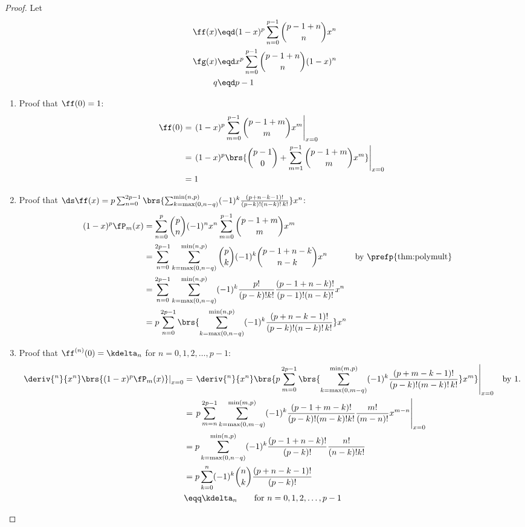 \begin{proof}
Let
\begin{align*}
  \ff(x) &\eqd (1-x)^p \sum_{n=0}^{p-1} {p-1+n \choose n} x^n      \\
  \fg(x) &\eqd x^p     \sum_{n=0}^{p-1} {p-1+n \choose n} (1-x)^n  \\
  q      &\eqd p-1
\end{align*}
  \begin{enumerate}
  \item Proof that $\ff(0)=1$:
  \begin{align*}
  \ff(0)
    &= \left.(1-x)^p \sum_{m=0}^{p-1} {p-1+m\choose m} x^m \right|_{x=0}
  \\&= \left.(1-x)^p \brs{{p-1 \choose 0} + \sum_{m=1}^{p-1} {p-1+m\choose m} x^m}\right|_{x=0}
  \\&= 1
  \end{align*}

  \item Proof that
      $\ds\ff(x)=
       p \sum_{n=0}^{2p-1}
       \brs{\sum_{k=\max(0,n-q)}^{\min(n,p)} (-1)^k \frac{(p+n-k-1)!}{(p-k)!(n-k)!\,k!}}
       x^n$:
  \begin{align*}
  (1-x)^p \fP_m(x)
    &= \sum_{n=0}^p     {p\choose n} (-1)^n x^n
       \sum_{m=0}^{p-1} {p-1+m\choose m} x^m
  \\&= \sum_{n=0}^{2p-1} \sum_{k=\max(0,n-q)}^{\min(n,p)}
       {p\choose k} (-1)^k {p-1+n-k\choose n-k} x^n
    && \text{by \prefp{thm:polymult}}
  \\&= \sum_{n=0}^{2p-1} \sum_{k=\max(0,n-q)}^{\min(n,p)}
       (-1)^k \frac{p!}{(p-k)!k!} \frac{(p-1+n-k)!}{(p-1)!(n-k)!} x^n
  \\&= p \sum_{n=0}^{2p-1}
       \brs{\sum_{k=\max(0,n-q)}^{\min(n,p)} (-1)^k \frac{(p+n-k-1)!}{(p-k)!(n-k)!\,k!}}
       x^n
  \end{align*}

  \item Proof that $\ff^{(n)}(0)=\kdelta_n$ for $n=0,1,2,\ldots,p-1$:
  \begin{align*}
  \left.\deriv{^n}{x^n}\brs{ (1-x)^p \fP_m(x) }\right|_{x=0}
    &= \left.
       \deriv{^n}{x^n}\brs{
         p \sum_{m=0}^{2p-1}
         \brs{\sum_{k=\max(0,m-q)}^{\min(m,p)} (-1)^k \frac{(p+m-k-1)!}{(p-k)!(m-k)!\,k!}}
         x^m
       }
       \right|_{x=0}
    && \text{by 1.}
  \\&= \left. p
       \sum_{m=n}^{2p-1} \sum_{k=\max(0,m-q)}^{\min(m,p)}
       (-1)^k \frac{(p-1+m-k)!}{(p-k)!(m-k)!k!} \frac{m!}{(m-n)!}x^{m-n}
       \right|_{x=0}
  \\&= p \sum_{k=\max(0,n-q)}^{\min(n,p)}
       (-1)^k \frac{(p-1+n-k)!}{(p-k)!} \frac{n!}{(n-k)!k!}
  \\&= p \sum_{k=0}^n
       (-1)^k {n\choose k} \frac{(p+n-k-1)!}{(p-k)!}
  \\&\eqq \kdelta_n \qquad\text{for } n=0,1,2,\ldots,p-1
  \end{align*}


\end{enumerate}
\end{proof}
